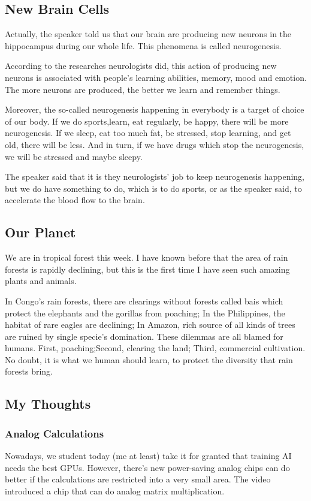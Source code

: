 \documentclass{article}
\begin{document}
\subsection{New Brain Cells}
Actually, the speaker told us that our brain are producing new neurons in the hippocampus during our whole life. This phenomena is called neurogenesis. 

According to the researches neurologists did, this action of producing new neurons is associated with people's learning abilities, memory, mood and emotion. The more neurons are produced, the better we learn and remember things.

Moreover, the so-called neurogenesis happening in everybody is a target of choice of our body. If we do sports,learn, eat regularly, be happy, there will be more neurogenesis. If we sleep, eat too much fat, be stressed, stop learning, and get old, there will be less. And in turn, if we have drugs which stop the neurogenesis, we will be stressed and maybe sleepy.

The speaker said that it is they neurologists' job to keep neurogenesis happening, but we do have something to do, which is to do sports, or as the speaker said, to accelerate the blood flow to the brain.

\subsection{Our Planet}
We are in tropical forest this week. I have known before that the area of rain forests is rapidly declining, but this is the first time I have seen such amazing plants and animals. 

In Congo's rain forests, there are clearings without forests called bais which protect the elephants and the gorillas from poaching; In the Philippines, the habitat of rare eagles are declining; In Amazon, rich source of all kinds of trees are ruined by single specie's domination. These dilemmas are all blamed for humans. First, poaching;Second, clearing the land; Third, commercial cultivation. No doubt, it is what we human should learn, to protect the diversity that rain forests bring.

\subsection{My Thoughts}
\subsubsection*{Analog Calculations}
Nowadays, we student today (me at least) take it for granted that training AI needs the best GPUs. However, there's new power-saving analog chips can do better if the calculations are restricted into a very small area. The video introduced a chip that can do analog matrix multiplication.
\end{document}
